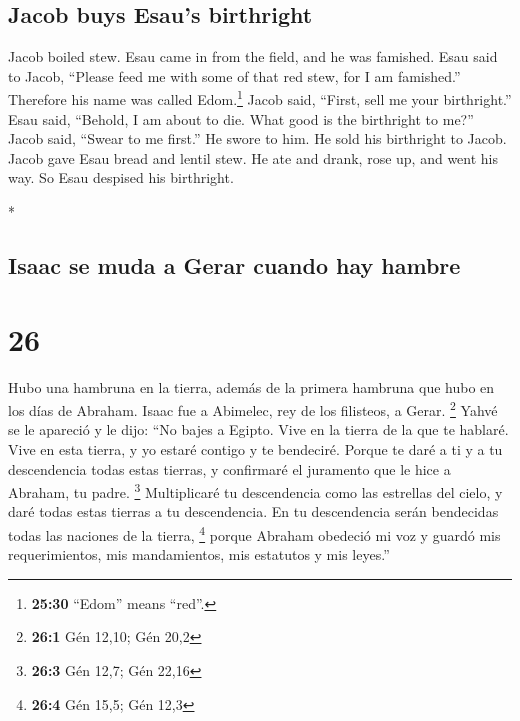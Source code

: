 \begin{paracol}{2}
\begin{otherlanguage}{english}
\hypertarget{jacob-buys-esaus-birthright}{%
\subsection{Jacob buys Esau's
birthright}\label{jacob-buys-esaus-birthright}}

 Jacob boiled stew. Esau came in from the field, and he
was famished.  Esau said to Jacob, ``Please feed me with
some of that red stew, for I am famished.'' Therefore his name was
called Edom.\footnote{\textbf{25:30} ``Edom'' means ``red''.}
 Jacob said, ``First, sell me your birthright.''
 Esau said, ``Behold, I am about to die. What good is the
birthright to me?''  Jacob said, ``Swear to me first.''
He swore to him. He sold his birthright to Jacob.  Jacob
gave Esau bread and lentil stew. He ate and drank, rose up, and went his
way. So Esau despised his birthright.

\end{otherlanguage}

\switchcolumn[0]*

\hypertarget{isaac-se-muda-a-gerar-cuando-hay-hambre}{%
\subsection{Isaac se muda a Gerar cuando hay
hambre}\label{isaac-se-muda-a-gerar-cuando-hay-hambre}}

\hypertarget{section-50}{%
\section{26}\label{section-50}}

 Hubo una hambruna en la tierra, además de la primera
hambruna que hubo en los días de Abraham. Isaac fue a Abimelec, rey de
los filisteos, a Gerar. \footnote{\textbf{26:1} Gén 12,10; Gén 20,2}
 Yahvé se le apareció y le dijo: ``No bajes a Egipto. Vive
en la tierra de la que te hablaré.  Vive en esta tierra, y
yo estaré contigo y te bendeciré. Porque te daré a ti y a tu
descendencia todas estas tierras, y confirmaré el juramento que le hice
a Abraham, tu padre. \footnote{\textbf{26:3} Gén 12,7; Gén 22,16}
 Multiplicaré tu descendencia como las estrellas del
cielo, y daré todas estas tierras a tu descendencia. En tu descendencia
serán bendecidas todas las naciones de la tierra, \footnote{\textbf{26:4}
  Gén 15,5; Gén 12,3}  porque Abraham obedeció mi voz y
guardó mis requerimientos, mis mandamientos, mis estatutos y mis
leyes.''


\end{paracol}
